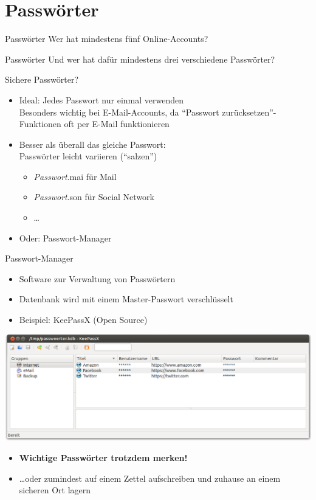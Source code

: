 \section{Passwörter}
  \begin{frame}{Passwörter}
    \Large Wer hat mindestens fünf Online-Accounts? 
  \end{frame}
  \begin{frame}{Passwörter}
    \Large Und wer hat dafür mindestens drei verschiedene Passwörter?
  \end{frame}
  \begin{frame}{Sichere Passwörter?}
    \begin{itemize}
      \item Ideal: Jedes Passwort nur einmal verwenden\\
      \small Besonders wichtig bei E-Mail-Accounts, da ``Passwort zurücksetzen''-Funktionen oft per E-Mail funktionieren \normalsize
      \item Besser als überall das gleiche Passwort:\\Passwörter leicht variieren (``salzen'')
      \begin{itemize}
        \item \textit{Passwort}.mai für Mail
        \item \textit{Passwort}.son für Social Network
        \item \ldots
      \end{itemize}
      \item Oder: Passwort-Manager
    \end{itemize}
  \end{frame}
  \begin{frame}{Passwort-Manager}
    \begin{itemize}
      \item Software zur Verwaltung von Passwörtern
      \item Datenbank wird mit einem Master-Passwort verschlüsselt
      \item Beispiel: KeePassX (Open Source)
    \end{itemize}
      \includegraphics[width=\textwidth]{images/keepassx.png}
    \begin{itemize}
      \item \textbf{Wichtige Passwörter trotzdem merken!}
      \item \ldots oder zumindest auf einem Zettel aufschreiben und zuhause an einem sicheren Ort lagern
    \end{itemize}
  \end{frame}

